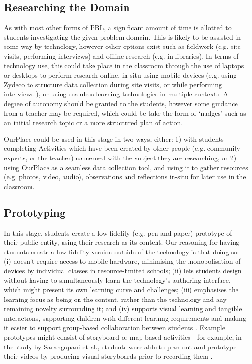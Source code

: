\subsection{Researching the Domain}
As with most other forms of PBL, a significant amount of time is allotted to students investigating the given problem domain. This is likely to be assisted in some way by technology, however other options exist such as fieldwork (e.g. site visits, performing interviews) and offline research (e.g. in libraries). In terms of technology use, this could take place in the classroom through the use of laptops or desktops to perform research online, in-situ using mobile devices (e.g. using Zydeco to structure data collection during site visits, or while performing interviews \citep{kuhn2011}), or using seamless learning technologies in multiple contexts. A degree of autonomy should be granted to the students, however some guidance from a teacher may be required, which could be take the form of `nudges' such as an initial research topic or a more structured plan of action.

OurPlace could be used in this stage in two ways, either: 1) with students completing Activities which have been created by other people (e.g. community experts, or the teacher) concerned with the subject they are researching; or 2) using OurPlace as a seamless data collection tool, and using it to gather resources (e.g. photos, video, audio), observations and reflections in-situ for later use in the classroom. 

\subsection{Prototyping}
In this stage, students create a low fidelity (e.g. pen and paper) prototype of their public entity, using their research as its content. Our reasoning for having students create a low-fidelity version outside of the technology is that doing so: (i) doesn't require access to mobile hardware, minimising the monopolisation of devices by individual classes in resource-limited schools; (ii) lets students design without having to simultaneously learn the technology's authoring interface, which might present its own learning curve and challenges; (iii) emphasises the learning focus as being on the content, rather than the technology \cite{Bell2010} and any remaining novelty surrounding it; and (iv) supports visual learning and tangible interactions, supporting children with different learning requirements and making it easier to support group-based collaboration between students \cite{Stanton2001}. Example prototypes might consist of storyboard or map-based activities---for example, in the study by Sarangapani et al., students were able to plan out and prototype their videos by producing visual storyboards prior to recording them \citep{Sarangapani2016}.


